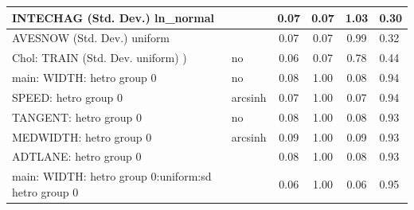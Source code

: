 \begin{table}
\begin{center}
\begin{tabular}{|l|l|c|c|c|l|}
			INTECHAG (Std. Dev.) ln_normal &  & 0.07 & 0.07 & 1.03 & 0.30 \\
			\hline
			AVESNOW (Std. Dev.) uniform &  & 0.07 & 0.07 & 0.99 & 0.32 \\
			\hline
			 Chol: TRAIN (Std. Dev. uniform) ) & no & 0.06 & 0.07 & 0.78 & 0.44 \\
			\hline
			main: WIDTH: hetro group 0 & no & 0.08 & 1.00 & 0.08 & 0.94 \\
			\hline
			SPEED: hetro group 0 & arcsinh & 0.07 & 1.00 & 0.07 & 0.94 \\
			\hline
			TANGENT: hetro group 0 & no & 0.08 & 1.00 & 0.08 & 0.93 \\
			\hline
			MEDWIDTH: hetro group 0 & arcsinh & 0.09 & 1.00 & 0.09 & 0.93 \\
			\hline
			ADTLANE: hetro group 0 &  & 0.08 & 1.00 & 0.08 & 0.93 \\
			\hline
			main: WIDTH: hetro group 0:uniform:sd  hetro group 0 &  & 0.06 & 1.00 & 0.06 & 0.95 \\
			\hline
		\end{tabular}
	\end{center}
\end{table}